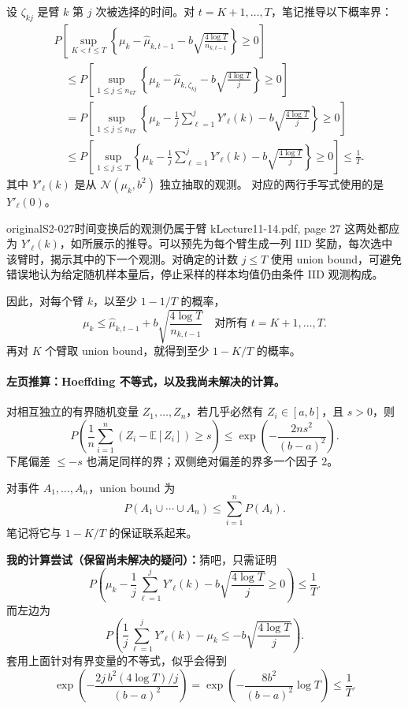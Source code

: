设 $\zeta_{kj}$ 是臂 $k$ 第 $j$ 次被选择的时间。对 $t=K+1,\ldots,T$，笔记推导以下概率界：
\begin{align*}
 &P\left[\sup_{K<t\le T}\left\{
 \mu_k-\widehat\mu_{k,t-1}
 -b\sqrt{\frac{4\log T}{n_{k,t-1}}}\right\}\ge0\right]\\
 &\quad\le P\left[\sup_{1\le j\le n_{kT}}\left\{
 \mu_k-\widehat\mu_{k,\zeta_{kj}}
 -b\sqrt{\frac{4\log T}{j}}\right\}\ge0\right]\\
 &\quad=P\left[\sup_{1\le j\le n_{kT}}\left\{
 \mu_k-\frac1j\sum_{\ell=1}^jY'_\ell(k)
 -b\sqrt{\frac{4\log T}{j}}\right\}\ge0\right]\\
 &\quad\le P\left[\sup_{1\le j\le T}\left\{
 \mu_k-\frac1j\sum_{\ell=1}^jY'_\ell(k)
 -b\sqrt{\frac{4\log T}{j}}\right\}\ge0\right]
 \le\frac1T.
\end{align*}
其中 $Y'_\ell(k)$ 是从 $\mathcal N(\mu_k,b^2)$ 独立抽取的观测。
对应的两行手写式使用的是 $Y'_\ell(0)$。
\begin{reviewnote}{original}{S2-027}{时间变换后的观测仍属于臂 k}{Lecture11-14.pdf, page 27}
这两处都应为 $Y'_\ell(k)$，如所展示的推导。可以预先为每个臂生成一列 IID 奖励，每次选中该臂时，揭示其中的下一个观测。对确定的计数 $j\le T$ 使用 union bound，可避免错误地认为给定随机样本量后，停止采样的样本均值仍由条件 IID 观测构成。
\end{reviewnote}


因此，对每个臂 $k$，以至少 $1-1/T$ 的概率，
\[
 \mu_k\le\widehat\mu_{k,t-1}
 +b\sqrt{\frac{4\log T}{n_{k,t-1}}}
 \quad\text{对所有 }t=K+1,\ldots,T.\tag{14.8}
\]
再对 $K$ 个臂取 union bound，就得到至少 $1-K/T$ 的概率。

\paragraph{左页推算：Hoeffding 不等式，以及我尚未解决的计算。}
对相互独立的有界随机变量 $Z_1,\ldots,Z_n$，若几乎必然有 $Z_i\in[a,b]$，且 $s>0$，则
\[
 P\left(\frac1n\sum_{i=1}^n(Z_i-\mathbb E[Z_i])\ge s\right)
 \le\exp\left(-\frac{2ns^2}{(b-a)^2}\right).
\]
下尾偏差 $\le-s$ 也满足同样的界；双侧绝对偏差的界多一个因子 $2$。

对事件 $A_1,\ldots,A_n$，union bound 为
\[
 P(A_1\cup\cdots\cup A_n)\le\sum_{i=1}^nP(A_i).
\]
笔记将它与 $1-K/T$ 的保证联系起来。

\textbf{我的计算尝试（保留尚未解决的疑问）：}猜吧，只需证明
\[
 P\left(\mu_k-\frac1j\sum_{\ell=1}^jY'_\ell(k)
 -b\sqrt{\frac{4\log T}{j}}\ge0\right)\le\frac1T.
\]
而左边为
\[
 P\left(\frac1j\sum_{\ell=1}^jY'_\ell(k)-\mu_k
 \le-b\sqrt{\frac{4\log T}{j}}\right).
\]
套用上面针对有界变量的不等式，似乎会得到
\[
 \exp\left(-\frac{2j\,b^2(4\log T)/j}{(b-a)^2}\right)
 =\exp\left(-\frac{8b^2}{(b-a)^2}\log T\right)
 \le\frac1T.
\]

